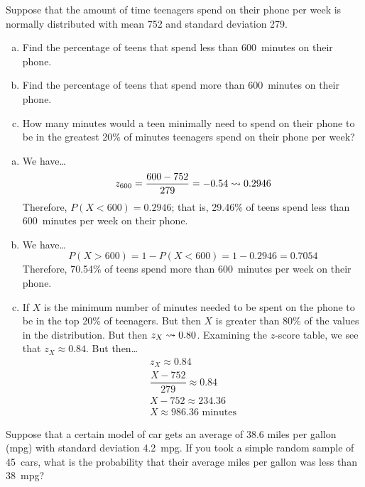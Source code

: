 \documentclass[12pt,letterpaper]{exam}
\begin{document}
\begin{questions}
\newpage
\question[10] Suppose that the amount of time teenagers spend on their phone per week is normally distributed with mean 752 and standard deviation 279.
	\begin{enumerate}[(a)]
	\item Find the percentage of teens that spend less than 600~minutes on their phone.
	\item Find the percentage of teens that spend more than 600~minutes on their phone. 
	\item How many minutes would a teen minimally need to spend on their phone to be in the greatest 20\% of minutes teenagers spend on their phone per week?
	\end{enumerate} \pspace

\sol 
\begin{enumerate}[(a)]
\item We have\dots
	\[
	z_{600}= \dfrac{600 - 752}{279}= -0.54 \rightsquigarrow 0.2946
	\]
Therefore, $P(X < 600)= 0.2946$; that is, 29.46\% of teens spend less than 600~minutes per week on their phone. \pspace

\item We have\dots
	\[
	P(X > 600)= 1 - P(X < 600)= 1 - 0.2946= 0.7054
	\] 
Therefore, 70.54\% of teens spend more than 600~minutes per week on their phone. \pspace

\item If $X$ is the minimum number of minutes needed to be spent on the phone to be in the top 20\% of teenagers. But then $X$ is greater than 80\% of the values in the distribution. But then $z_X \rightsquigarrow 0.80$. Examining the $z$-score table, we see that $z_X \approx 0.84$. But then\dots
	\[
	\begin{gathered}
	z_X \approx 0.84 \\[0.3cm]
	\dfrac{X - 752}{279} \approx 0.84 \\[0.3cm]
	X - 752 \approx 234.36 \\[0.3cm]
	X \approx 986.36 \text{ minutes}
	\end{gathered}
	\]
\end{enumerate}



\newpage
\question[10] Suppose that a certain model of car gets an average of 38.6 miles per gallon (mpg) with standard deviation 4.2~mpg. If you took a simple random sample of 45~cars, what is the probability that their average miles per gallon was less than 38~mpg? \pspace


\end{questions}
\end{document}
